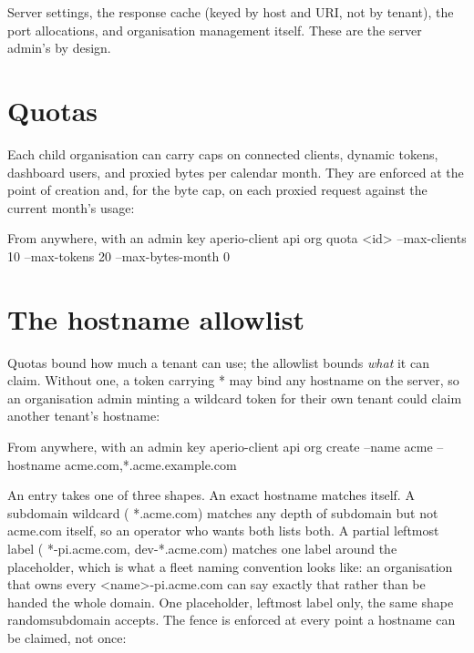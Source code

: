 \documentclass[11pt,a4paper,oneside]{book}
\newcommand{\aperiobreakableunderscore}{\textunderscore\allowbreak}
\newcommand{\aperiocodebreaks}{\XeTeXinterchartokenstate=1 }
\newcommand{\aperiocodebreaks}{}
\DeclareRobustCommand{\code}[1]{{\ttfamily\small\aperiocodebreaks
  \let\_\aperiobreakableunderscore#1}}
\begin{document}
Server settings, the response cache (keyed by host and URI, not by
tenant), the port allocations, and organisation management itself. These
are the server admin's by design.

\section{Quotas}

Each child organisation can carry caps on connected clients, dynamic
tokens, dashboard users, and proxied bytes per calendar month. They are
enforced at the point of creation and, for the byte cap, on each proxied
request against the current month's usage:

\begin{codecard}[aperiosh]{From anywhere, with an admin key}
aperio-client api org quota <id> --max-clients 10 --max-tokens 20 --max-bytes-month 0
\end{codecard}

\section{The hostname allowlist}

Quotas bound how much a tenant can use; the allowlist bounds \emph{what}
it can claim. Without one, a token carrying \code{*} may bind any hostname
on the server, so an organisation admin minting a wildcard token for their
own tenant could claim another tenant's hostname:

\begin{codecard}[aperiosh]{From anywhere, with an admin key}
aperio-client api org create --name acme --hostname acme.com,*.acme.example.com
\end{codecard}

An entry takes one of three shapes. An exact hostname matches itself. A
subdomain wildcard (\code{*.acme.com}) matches any depth of subdomain but
not \code{acme.com} itself, so an operator who wants both lists both. A
partial leftmost label (\code{*-pi.acme.com}, \code{dev-*.acme.com})
matches one label around the placeholder, which is what a fleet naming
convention looks like: an organisation that owns every
\code{<name>-pi.acme.com} can say exactly that rather than be handed the
whole domain. One placeholder, leftmost label only, the same shape
\code{random\_subdomain} accepts. The fence is enforced at every point a
hostname can be claimed, not once:
\end{document}
